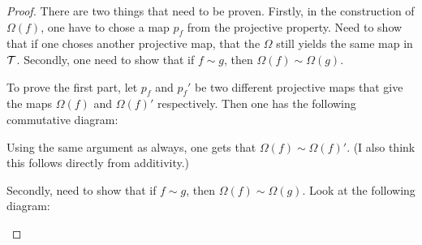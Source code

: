 \begin{proof}
    There are two things that need to be proven. Firstly, in the construction of \( \Omega(f) \), one have to chose a map \( p_f \) from the projective property. Need to show that if one choses another projective map, that the \( \Omega \) still yields the same map in \( {\mathcal{T}} \). Secondly, one need to show that if \( f \sim g \), then \( \Omega(f) \sim \Omega(g) \).

    To prove the first part, let \( p_f \) and \( p_f' \) be two different projective maps that give the maps \( \Omega(f) \) and \( \Omega(f)' \) respectively. Then one has the following commutative diagram:

    \begin{center}
    \end{center}

    Using the same argument as always, one gets that \( \Omega(f) \sim \Omega(f)' \). (I also think this follows directly from additivity.)

    Secondly, need to show that if \( f \sim g \), then \( \Omega(f) \sim \Omega(g) \). Look at the following diagram:

    \begin{center}
\end{center}
\end{proof}
